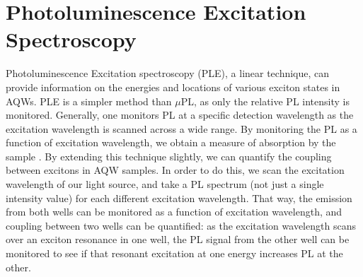 \section{Photoluminescence Excitation Spectroscopy}
\indent  Photoluminescence Excitation spectroscopy (PLE), a linear technique, can provide information on the energies and locations of various exciton states in AQWs. PLE is a simpler method than $\mu$PL, as only the relative PL intensity is monitored. Generally, one monitors PL at a specific detection wavelength as the excitation wavelength is scanned across a wide range. By monitoring the PL as a function of excitation wavelength, we obtain a measure of absorption by the sample \cite{fox}. By extending this technique slightly, we can quantify the coupling between excitons in AQW samples. In order to do this, we scan the excitation wavelength of our light source, and take a PL spectrum (not just a single intensity value) for each different excitation wavelength. That way, the emission from both wells can be monitored as a function of excitation wavelength, and coupling between two wells can be quantified: as the excitation wavelength scans over an exciton resonance in one well, the PL signal from the other well can be monitored to see if that resonant excitation at one energy increases PL at the other. 
